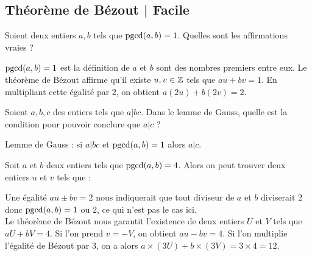 \subsection{Théorème de Bézout | Facile}



\begin{question}
    Soient deux entiers $a,b$ tels que $\mathop{\text{pgcd}}(a,b)=1$.
    Quelles sont les affirmations vraies ?
    \begin{answers} 
    \end{answers}
    \begin{explanations} 
      $\mathop{\text{pgcd}}(a,b)=1$ est la définition de   $a$ et $b$ sont des nombres premiers entre eux.
      Le théorème de Bézout affirme qu'il existe $u,v\in\mathbb{Z}$ tels que $au+bv=1$.
      En multipliant cette égalité par $2$, on obtient $a(2u)+b(2v)=2$.
    \end{explanations}
\end{question}


\begin{question}
    Soient $a,b,c$ des entiers tels que $a | bc$.
    Dans le lemme de Gauss, quelle est la condition pour pouvoir conclure que $a|c$ ?
    \begin{answers} 
    \end{answers}
    \begin{explanations} 
    Lemme de Gauss : si $a | bc$ et $\mathop{\text{pgcd}}(a,b)=1$ alors $a|c$.
    \end{explanations}
\end{question}


\begin{question}
 Soit $a$ et $b$ deux entiers tels que $\mathop{\text{pgcd}}(a,b) = 4$. Alors on peut trouver deux entiers $u$ et $v$ tels que :
    \begin{answers} 
    \end{answers}
    \begin{explanations} 
    Une égalité $au \pm bv = 2$ nous indiquerait que tout diviseur de $a$ et $b$ diviserait $2$ donc $\mathop{\text{pgcd}}(a,b) = 1$ ou $2$, ce qui n'est pas le cas ici.\\
    Le théorème de Bézout nous garantit l'existence de deux entiers $U$ et $V$ tels que $aU + bV = 4$. Si l'on prend $v=-V$, on obtient $au-bv=4$. Si l'on multiplie l'égalité de Bézout par $3$, on a alors $a \times (3U) + b \times (3V) = 3 \times 4 = 12$.
    \end{explanations}
\end{question}



